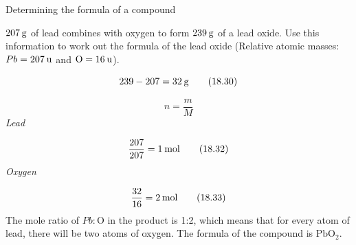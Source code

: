      \begin{wex}{Determining the formula of a compound }{
      \label{m38712*probfhsst!!!underscore!!!id1236}
      \label{m38712*id281333}$207\phantom{\rule{2pt}{0ex}}\mathrm{g}$ of lead combines with oxygen to form $239\phantom{\rule{2pt}{0ex}}\mathrm{g}$ of a lead oxide. Use this information to work out the formula of the lead oxide (Relative atomic masses: $Pb=207\phantom{\rule{2pt}{0ex}}\mathrm{u}$ and $\mathrm{O}=16\phantom{\rule{2pt}{0ex}}\mathrm{u}$).\par 
}
{
      \label{m38712*id281379}\nopagebreak\noindent{}
    \begin{equation}
    239-207=32\phantom{\rule{2pt}{0ex}}\mathrm{g}\tag{18.30}
      \end{equation}
      \label{m38712*id281407}\nopagebreak\noindent{}
        
    \begin{equation}
    n=\frac{m}{M}\tag{18.31}
      \end{equation}
      \label{m38712*id281427}
        \textsl{Lead}
      \par 
      \label{m38712*id281433}\nopagebreak\noindent{}
        
    \begin{equation}
    \frac{207}{207}=1\phantom{\rule{2pt}{0ex}}\mathrm{mol}\tag{18.32}
      \end{equation}
      \label{m38712*id281460}
        \textsl{Oxygen}
      \par 
      \label{m38712*id281467}\nopagebreak\noindent{}
        
    \begin{equation}
    \frac{32}{16}=2\phantom{\rule{2pt}{0ex}}\mathrm{mol}\tag{18.33}
      \end{equation}
      \label{m38712*id281498}The mole ratio of $Pb:\mathrm{O}$ in the product is 1:2, which means that for every atom of lead, there will be two atoms of oxygen. The formula of the compound is $\mathrm{PbO}{}_{2}$.\par 
}
    \end{wex}
    \noindent
\label{m38712*secfhsst!!!underscore!!!id1308}\vspace{.5cm} 
      \noindent 
